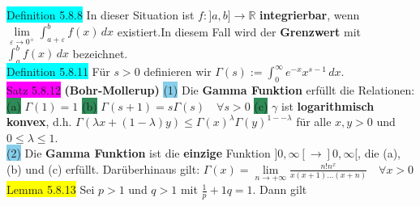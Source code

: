 \documentclass[landscape, 10pt]{article}
\newcommand{\R}{\mathbb{R}}
\begin{document}
\begin{multicols}{3}
              \colorbox{cyan}{Definition 5.8.8} In dieser Situation ist 
                     \textcolor{NavyBlue}{$f:]a,b]\longrightarrow\R$} 
                     \textbf{integrierbar}, wenn \textcolor{NavyBlue}{
                     $\lim\limits_{\varepsilon\to0^+}\int_{a+\varepsilon}^bf(x)\,dx$} 
                     existiert.In diesem Fall wird der \textbf{Grenzwert} mit 
                     \textcolor{NavyBlue}{$\int_a^bf(x)\,dx$} bezeichnet. \\
              \colorbox{cyan}{Definition 5.8.11} 
                     Für \textcolor{NavyBlue}{$s>0$} definieren wir 
                     \textcolor{NavyBlue}{
                     $\Gamma(s):=\int_0^\infty e^{-x}x^{s-1}\,dx$}. \\
              \colorbox{magenta}{Satz 5.8.12} 
              \textbf{(Bohr-Mollerup)} 
                     \colorbox{SkyBlue}{(1)} 
                            Die \textbf{Gamma Funktion} erfüllt die Relationen: 
                            \colorbox{SeaGreen}{(a)}
                                   \textcolor{NavyBlue}{$\Gamma(1)=1$} \qquad
                            \colorbox{SeaGreen}{(b)} 
                                   \textcolor{NavyBlue}{
                                   $\Gamma(s+1)=s\Gamma(s)\quad\forall s>0$} 
                            \colorbox{SeaGreen}{(c)} 
                                   \textcolor{NavyBlue}{$\gamma$} ist 
                                   \textbf{logarithmisch konvex}, d.h. 
                                   \textcolor{NavyBlue}{
                                   $\Gamma(\lambda x+(1-\lambda)y)
                                   \leqslant\Gamma(x)^\lambda\Gamma(y)^{1--\lambda}$}
                                   für alle \textcolor{NavyBlue}{$x,y>0$} und 
                                   \textcolor{NavyBlue}{
                                   $0\leqslant\lambda\leqslant1$}.\\
              \colorbox{SkyBlue}{(2)} Die \textbf{Gamma Funktion} ist die 
                     \textbf{einzige} Funktion 
                     \textcolor{NavyBlue}{$]0,\infty[\longrightarrow]0,\infty[$},
                     die (a), (b) und (c) erfüllt. 
                     Darüberhinaus gilt: 
                     \textcolor{NavyBlue}{$\Gamma(x)
                     =\lim\limits_{n\to+\infty}\frac{n!n^x}{x(x+1)...(x+n)}\quad
                     \forall x>0$}
              \colorbox{yellow}{Lemma 5.8.13} Sei \textcolor{NavyBlue}{$p>1$} und 
                     \textcolor{NavyBlue}{$q>1$} mit 
                     \textcolor{NavyBlue}{$\frac{1}{p}+{1}{q}=1$}. Dann gilt 

\end{multicols}
\end{document}
